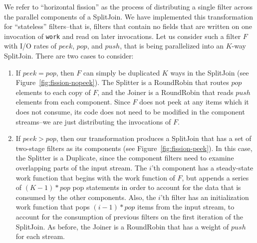 We refer to ``horizontal fission'' as the process of distributing a
single filter across the parallel components of a SplitJoin.  We have
implemented this transformation for ``stateless'' filters--that is,
filters that contain no fields that are written on one invocation of
{\tt work} and read on later invocations.  Let us consider such a
filter $F$ with I/O rates of $peek$, $pop$, and $push$, that is being
parallelized into an $K$-way SplitJoin.  There are two cases to
consider:
\begin{enumerate}
\item If {\bf $peek = pop$}, then $F$ can simply be duplicated $K$
ways in the SplitJoin (see Figure~\ref{fig:fission-nopeek}).  The
Splitter is a RoundRobin that routes $pop$ elements to each copy of
$F$, and the Joiner is a RoundRobin that reads $push$ elements from
each component.  Since $F$ does not peek at any items which it does
not consume, its code does not need to be modified in the component
streams--we are just distributing the invocations of $F$.

\item If {\bf $peek > pop$}, then our transformation produces a
SplitJoin that has a set of two-stage filters as its components (see
Figure~\ref{fig:fission-peek}).  In this case, the Splitter is a
Duplicate, since the component filters need to examine overlapping
parts of the input stream.  The $i$'th component has a steady-state
work function that begins with the work function of $F$, but appends a
series of $(K-1)*pop$ pop statements in order to account for the data
that is consumed by the other components.  Also, the $i$'th filter has
an initialization work function that pops $(i-1)*pop$ items from the
input stream, to account for the consumption of previous filters on
the first iteration of the SplitJoin.  As before, the Joiner is a
RoundRobin that has a weight of $push$ for each stream.
\end{enumerate}

